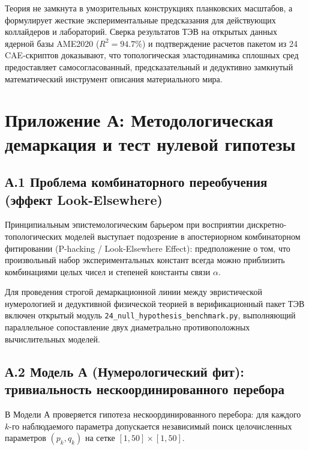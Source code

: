 \documentclass[11pt,a4paper]{article}
\theoremstyle{definition}
\theoremstyle{remark}
\begin{document}
Теория не замкнута в умозрительных конструкциях планковских масштабов, а формулирует жесткие экспериментальные предсказания для действующих коллайдеров и лабораторий. Сверка результатов ТЭВ на открытых данных ядерной базы AME2020 ($R^2 = 94.7\%$) и подтверждение расчетов пакетом из 24 CAE-скриптов доказывают, что топологическая эластодинамика сплошных сред предоставляет самосогласованный, предсказательный и дедуктивно замкнутый математический инструмент описания материального мира.


\FloatBarrier
\section*{Приложение А: Методологическая демаркация и тест нулевой гипотезы}
\label{sec:null_hypothesis_demarcation}

\subsection*{А.1 Проблема комбинаторного переобучения (эффект Look-Elsewhere)}
Принципиальным эпистемологическим барьером при восприятии дискретно-топологических моделей выступает подозрение в апостериорном комбинаторном фитировании (P-hacking / Look-Elsewhere Effect): предположение о том, что произвольный набор экспериментальных констант всегда можно приблизить комбинациями целых чисел и степеней константы связи $\alpha$.

Для проведения строгой демаркационной линии между эвристической нумерологией и дедуктивной физической теорией в верификационный пакет ТЭВ включен открытый модуль \texttt{24\_null\_hypothesis\_benchmark.py}, выполняющий параллельное сопоставление двух диаметрально противоположных вычислительных моделей.

\subsection*{А.2 Модель А (Нумерологический фит): тривиальность нескоординированного перебора}
В Модели А проверяется гипотеза нескоординированного перебора: для каждого $k$-го наблюдаемого параметра допускается независимый поиск целочисленных параметров $(p_k, q_k)$ на сетке $[1, 50] \times [1, 50]$. 
\end{document}
